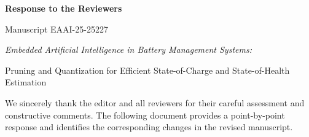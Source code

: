 \documentclass[11pt,a4paper]{article}
\begin{document}
\begin{center}
  {\LARGE\bfseries Response to the Reviewers\par}
  \vspace{0.7em}
  {\large Manuscript EAAI-25-25227\par}
  \vspace{0.4em}
  {\itshape Embedded Artificial Intelligence in Battery Management Systems:\par
  Pruning and Quantization for Efficient State-of-Charge and State-of-Health Estimation\par}
\end{center}

\vspace{1em}
We sincerely thank the editor and all reviewers for their careful assessment and constructive comments. The following document provides a point-by-point response and identifies the corresponding changes in the revised manuscript.

\clearpage
{}
\clearpage
{}
\clearpage
{}
\clearpage
{}
\end{document}
